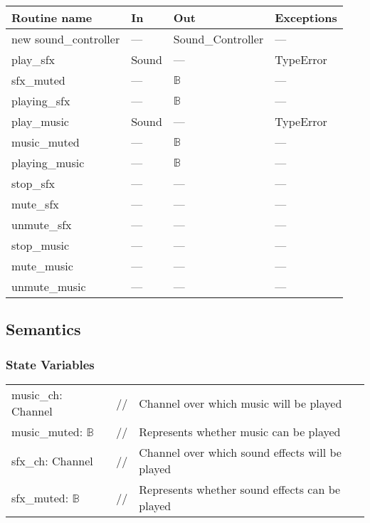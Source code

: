 \documentclass[12pt]{article}
\begin{document}
\begin{tabular}{| l | l | l | p{5cm} |}
\hline
\textbf{Routine name} & \textbf{In} & \textbf{Out} & \textbf{Exceptions}\\
\hline
new sound\_controller & --- & Sound\_Controller & ---\\
\hline
play\_sfx             & Sound & ---          & TypeError\\
\hline
sfx\_muted            & ---   & $\mathbb{B}$ & ---\\
\hline
playing\_sfx          & ---   & $\mathbb{B}$ & ---\\
\hline
play\_music           & Sound & ---          & TypeError\\
\hline
music\_muted          & ---   & $\mathbb{B}$ & ---\\
\hline
playing\_music        & ---   & $\mathbb{B}$ & ---\\
\hline
stop\_sfx             & ---   & ---          & ---\\
\hline
mute\_sfx             & ---   & ---          & ---\\
\hline
unmute\_sfx           & ---   & ---          & ---\\
\hline
stop\_music           & ---   & ---          & ---\\
\hline
mute\_music           & ---   & ---          & ---\\
\hline
unmute\_music         & ---   & ---          & ---\\
\hline
\end{tabular}

\subsection* {Semantics}

\subsubsection* {State Variables}

\begin{tabular}{lll}
    music\_ch: Channel         & // & Channel over which music will be played\\ 
    music\_muted: $\mathbb{B}$ & // & Represents whether music can be played\\
    sfx\_ch: Channel           & // & Channel over which sound effects will be played\\
    sfx\_muted: $\mathbb{B}$   & // & Represents whether sound effects can be played
\end{tabular}
\end{document}
